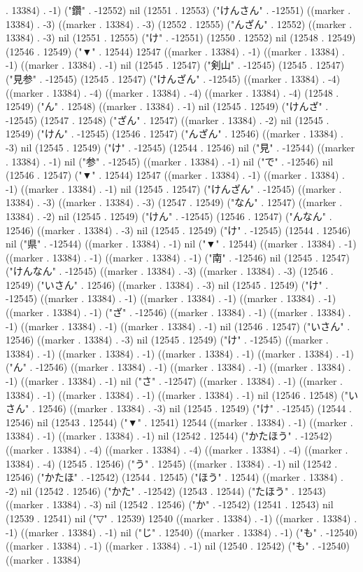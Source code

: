 . 13384) . -1) ("鑽" . -12552) nil (12551 . 12553) ("けんさん" . -12551) ((marker . 13384) . -3) ((marker . 13384) . -3) (12552 . 12555) ("んざん" . 12552) ((marker . 13384) . -3) nil (12551 . 12555) ("け" . -12551) (12550 . 12552) nil (12548 . 12549) (12546 . 12549) ("▼" . 12544) 12547 ((marker . 13384) . -1) ((marker . 13384) . -1) ((marker . 13384) . -1) nil (12545 . 12547) ("剣山" . -12545) (12545 . 12547) ("見参" . -12545) (12545 . 12547) ("けんざん" . -12545) ((marker . 13384) . -4) ((marker . 13384) . -4) ((marker . 13384) . -4) ((marker . 13384) . -4) (12548 . 12549) ("ん" . 12548) ((marker . 13384) . -1) nil (12545 . 12549) ("けんざ" . -12545) (12547 . 12548) ("ざん" . 12547) ((marker . 13384) . -2) nil (12545 . 12549) ("けん" . -12545) (12546 . 12547) ("んざん" . 12546) ((marker . 13384) . -3) nil (12545 . 12549) ("け" . -12545) (12544 . 12546) nil ("見" . -12544) ((marker . 13384) . -1) nil ("参" . -12545) ((marker . 13384) . -1) nil ("で" . -12546) nil (12546 . 12547) ("▼" . 12544) 12547 ((marker . 13384) . -1) ((marker . 13384) . -1) ((marker . 13384) . -1) nil (12545 . 12547) ("けんざん" . -12545) ((marker . 13384) . -3) ((marker . 13384) . -3) (12547 . 12549) ("なん" . 12547) ((marker . 13384) . -2) nil (12545 . 12549) ("けん" . -12545) (12546 . 12547) ("んなん" . 12546) ((marker . 13384) . -3) nil (12545 . 12549) ("け" . -12545) (12544 . 12546) nil ("県" . -12544) ((marker . 13384) . -1) nil ("▼" . 12544) ((marker . 13384) . -1) ((marker . 13384) . -1) ((marker . 13384) . -1) ("南" . -12546) nil (12545 . 12547) ("けんなん" . -12545) ((marker . 13384) . -3) ((marker . 13384) . -3) (12546 . 12549) ("いさん" . 12546) ((marker . 13384) . -3) nil (12545 . 12549) ("け" . -12545) ((marker . 13384) . -1) ((marker . 13384) . -1) ((marker . 13384) . -1) ((marker . 13384) . -1) ("ざ" . -12546) ((marker . 13384) . -1) ((marker . 13384) . -1) ((marker . 13384) . -1) ((marker . 13384) . -1) nil (12546 . 12547) ("いさん" . 12546) ((marker . 13384) . -3) nil (12545 . 12549) ("け" . -12545) ((marker . 13384) . -1) ((marker . 13384) . -1) ((marker . 13384) . -1) ((marker . 13384) . -1) ("ん" . -12546) ((marker . 13384) . -1) ((marker . 13384) . -1) ((marker . 13384) . -1) ((marker . 13384) . -1) nil ("さ" . -12547) ((marker . 13384) . -1) ((marker . 13384) . -1) ((marker . 13384) . -1) ((marker . 13384) . -1) nil (12546 . 12548) ("いさん" . 12546) ((marker . 13384) . -3) nil (12545 . 12549) ("け" . -12545) (12544 . 12546) nil (12543 . 12544) ("▼" . 12541) 12544 ((marker . 13384) . -1) ((marker . 13384) . -1) ((marker . 13384) . -1) nil (12542 . 12544) ("かたほう" . -12542) ((marker . 13384) . -4) ((marker . 13384) . -4) ((marker . 13384) . -4) ((marker . 13384) . -4) (12545 . 12546) ("う" . 12545) ((marker . 13384) . -1) nil (12542 . 12546) ("かたほ" . -12542) (12544 . 12545) ("ほう" . 12544) ((marker . 13384) . -2) nil (12542 . 12546) ("かた" . -12542) (12543 . 12544) ("たほう" . 12543) ((marker . 13384) . -3) nil (12542 . 12546) ("か" . -12542) (12541 . 12543) nil (12539 . 12541) nil ("▽" . 12539) 12540 ((marker . 13384) . -1) ((marker . 13384) . -1) ((marker . 13384) . -1) nil ("じ" . 12540) ((marker . 13384) . -1) ("も" . -12540) ((marker . 13384) . -1) ((marker . 13384) . -1) nil (12540 . 12542) ("も" . -12540) ((marker . 13384) 